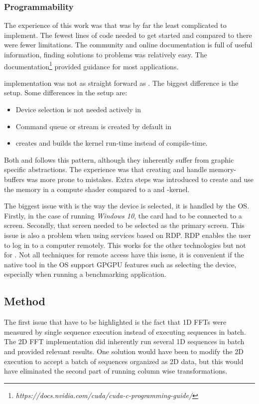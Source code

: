 \subsubsection{Programmability}

The experience of this work was that {\CU} was by far the least complicated to implement. The fewest lines of code needed to get started and compared to {\CPP} there were fewer limitations. The {\CU} community and online documentation is full of useful information, finding solutions to problems was relatively easy. The documentation\footnote{\textit{https://docs.nvidia.com/cuda/cuda-c-programming-guide/}} provided guidance for most applications.

{\OCL} implementation was not as straight forward as {\CU}. The biggest difference is the setup. Some differences in the setup are:
\begin{itemize}
	\item Device selection is not needed actively in {\CU}
	\item Command queue or stream is created by default in {\CU}
	\item {\CU} creates and builds the \gls{kernel} run-time instead of compile-time.
\end{itemize}
Both {\DX} and {\GL} follows this pattern, although they inherently suffer from graphic specific abstractions. The experience was that creating and handle memory-buffers was more prone to mistakes. Extra steps was introduced to create and use the memory in a compute shader compared to a {\CU} and {\OCL}-kernel.

The biggest issue with {\GL} is the way the device is selected, it is handled by the \gls{OS}. Firstly, in the case of running \emph{Windows 10}, the card had to be connected to a screen. Secondly, that screen needed to be selected as the primary screen. This issue is also a problem when using services based on \gls{RDP}. \gls{RDP} enables the user to log in to a computer remotely. This works for the other technologies but not for {\GL}. Not all techniques for remote access have this issue, it is convenient if the native tool in the \gls{OS} support \gls{GPGPU} features such as selecting the device, especially when running a benchmarking application.

\subsection{Method}

The first issue that have to be highlighted is the fact that \gls{1D} \gls{FFT}s were measured by single sequence execution instead of executing sequences in batch. The \gls{2D} \gls{FFT} implementation did inherently run several \gls{1D} sequences in batch and provided relevant results. One solution would have been to modify the \gls{2D} execution to accept a batch of sequences organized as \gls{2D} data, but this would have eliminated the second part of running column wise transformations.

